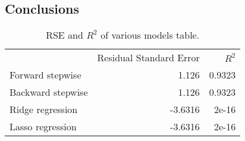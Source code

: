 \subsection{Conclusions}

\begin{table}[H]
	\centering
	\begin{tabular}{|| l | r | r ||} 
						 & Residual Standard Error & $R^2$ \\
		Forward stepwise & 1.126 & 0.9323 \\
		\hline
		Backward stepwise & 1.126 & 0.9323 \\
		\hline
		Ridge regression & -3.6316 & 2e-16 \\
		\hline
		Lasso regression & -3.6316 & 2e-16 \\
		\hline
	\end{tabular}
	\caption{RSE and $R^2$ of various models table.}
	\label{table:RegEvalParams}
\end{table}